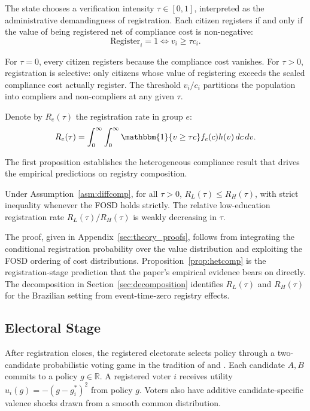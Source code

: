 The state chooses a verification intensity $\tau \in [0, 1]$, interpreted as the administrative demandingness of registration. Each citizen registers if and only if the value of being registered net of compliance cost is non-negative:
\begin{equation}
\text{Register}_i = 1 \iff v_i \geq \tau c_i.
\label{eq:registration_rule}
\end{equation}

For $\tau = 0$, every citizen registers because the compliance cost vanishes. For $\tau > 0$, registration is selective: only citizens whose value of registering exceeds the scaled compliance cost actually register. The threshold $v_i / c_i$ partitions the population into compliers and non-compliers at any given $\tau$.

Denote by $R_e(\tau)$ the registration rate in group $e$:
\begin{equation}
R_e(\tau) = \int_0^\infty \int_0^\infty \mathbbm{1}\{v \geq \tau c\} f_e(c) h(v) \, dc \, dv.
\label{eq:registration_rate}
\end{equation}

The first proposition establishes the heterogeneous compliance result that drives the empirical predictions on registry composition.

\begin{proposition}
\label{prop:hetcomp}
Under Assumption~\ref{asm:diffcomp}, for all $\tau > 0$, $R_L(\tau) \leq R_H(\tau)$, with strict inequality whenever the FOSD holds strictly. The relative low-education registration rate $R_L(\tau)/R_H(\tau)$ is weakly decreasing in $\tau$.
\end{proposition}

The proof, given in Appendix~\ref{sec:theory_proofs}, follows from integrating the conditional registration probability over the value distribution and exploiting the FOSD ordering of cost distributions. Proposition~\ref{prop:hetcomp} is the registration-stage prediction that the paper's empirical evidence bears on directly. The decomposition in Section~\ref{sec:decomposition} identifies $R_L(\tau)$ and $R_H(\tau)$ for the Brazilian setting from event-time-zero registry effects.

\subsection{Electoral Stage}
\label{ssec:electoral}

After registration closes, the registered electorate selects policy through a two-candidate probabilistic voting game in the tradition of \citet{LindbeckWeibull1987} and \citet{DixitLondregan1996}. Each candidate $A, B$ commits to a policy $g \in \mathbb{R}$. A registered voter $i$ receives utility $u_i(g) = -(g - g_i^*)^2$ from policy $g$. Voters also have additive candidate-specific valence shocks drawn from a smooth common distribution.

